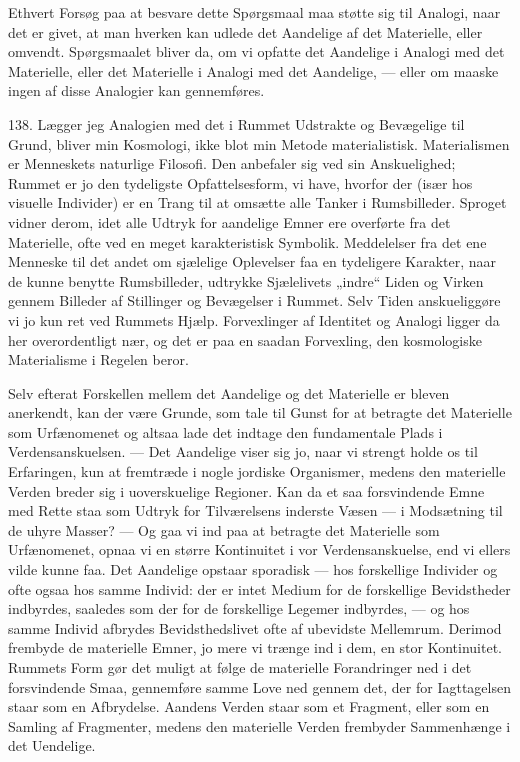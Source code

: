\documentclass[12pt,a4paper]{book}
\newcommand{\apage}[1]{\marginnote{\footnotesize\textit{[#1]}}}
\begin{document}
Ethvert Forsøg paa at besvare dette Spørgsmaal maa støtte sig til Analogi, naar det er
givet, at man hverken kan udlede det Aandelige af det Materielle, eller omvendt.
Spørgsmaalet bliver da, om vi opfatte det Aandelige i Analogi med det Materielle, eller
det Materielle i Analogi med det Aandelige, --- eller om maaske ingen af disse Analogier
kan gennemføres.

138. Lægger jeg Analogien med det i Rummet Udstrakte og Bevægelige til Grund, bliver min
Kosmologi, ikke blot min Metode materialistisk. Materialismen er Menneskets naturlige
Filosofi. Den anbefaler sig ved sin Anskuelighed; Rummet er jo den tydeligste
Opfattelsesform, vi have, hvorfor der (især hos visuelle Individer) er en Trang til at
omsætte alle Tanker i Rumsbilleder. Sproget vidner derom, idet alle Udtryk for aandelige
Emner ere overførte fra det Materielle, ofte ved en meget karakteristisk Symbolik.
Meddelelser fra det ene Menneske til det andet om sjælelige Oplevelser faa en tydeligere
Karakter, naar de kunne benytte Rumsbilleder, udtrykke Sjælelivets „indre“ Liden og
Virken gennem Billeder af Stillinger og Bevægelser i Rummet. Selv Tiden anskueliggøre vi jo kun ret ved Rummets Hjælp. Forvexlinger af Identitet og Analogi ligger da her
overordentligt nær, og det er paa en saadan Forvexling, den kosmologiske Materialisme i
Regelen beror.

Selv efterat Forskellen mellem det Aandelige og det Materielle er bleven anerkendt, kan
der være Grunde, som tale \apage{331} til Gunst for at betragte det Materielle som Urfænomenet og altsaa
lade det indtage den fundamentale Plads i Verdensanskuelsen. --- Det Aandelige viser sig
jo, naar vi strengt holde os til Erfaringen, kun at fremtræde i nogle jordiske Organismer,
medens den materielle Verden breder sig i uoverskuelige Regioner. Kan da et saa
forsvindende Emne med Rette staa som Udtryk for Tilværelsens inderste Væsen --- i
Modsætning til de uhyre Masser? --- Og gaa vi ind paa at betragte det Materielle som
Urfænomenet, opnaa vi en større Kontinuitet i vor Verdensanskuelse, end vi ellers vilde
kunne faa. Det Aandelige opstaar sporadisk --- hos forskellige Individer og ofte ogsaa hos
samme Individ: der er intet Medium for de forskellige Bevidstheder indbyrdes, saaledes som
der for de forskellige Legemer indbyrdes, --- og hos samme Individ afbrydes
Bevidsthedslivet ofte af ubevidste Mellemrum. Derimod frembyde de materielle Emner, jo mere
vi trænge ind i dem, en stor Kontinuitet. Rummets Form gør det muligt at følge de
materielle Forandringer ned i det forsvindende Smaa, gennemføre samme Love ned gennem det,
der for Iagttagelsen staar som en Afbrydelse. Aandens Verden staar som et Fragment, eller
som en Samling af Fragmenter, medens den materielle Verden frembyder Sammenhænge i det
Uendelige.
\end{document}
